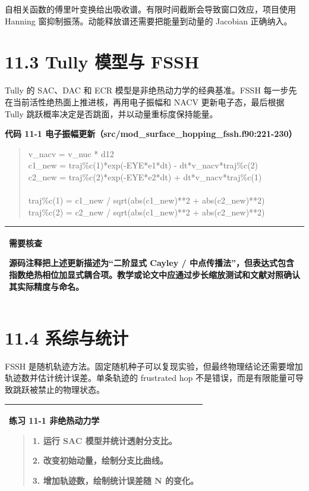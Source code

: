 \documentclass[UTF8,openany,11pt,fontset=fandol]{ctexbook}
\begin{document}
自相关函数的傅里叶变换给出吸收谱。有限时间截断会导致窗口效应，项目使用
Hanning 窗抑制振荡。动能释放谱还需要把能量到动量的 Jacobian 正确纳入。

\section{\texorpdfstring{\textbf{11.3 Tully 模型与
FSSH}}{11.3 Tully 模型与 FSSH}}\label{tully-ux6a21ux578bux4e0e-fssh}

Tully 的 SAC、DAC 和 ECR 模型是非绝热动力学的经典基准。FSSH
每一步先在当前活性绝热面上推进核，再用电子振幅和 NACV
更新电子态，最后根据 Tully
跳跃概率决定是否跳面，并以动量重标度保持能量。

\textbf{代码 11-1
电子振幅更新（src/mod\_surface\_hopping\_fssh.f90:221-230）}

\begin{quote}
v\_nacv = v\_nuc * d12\\
c1\_new = traj\%c(1)*exp(-EYE*e1*dt) - dt*v\_nacv*traj\%c(2)\\
c2\_new = traj\%c(2)*exp(-EYE*e2*dt) + dt*v\_nacv*traj\%c(1)\\
~\\
traj\%c(1) = c1\_new / sqrt(abs(c1\_new)**2 + abs(c2\_new)**2)\\
traj\%c(2) = c2\_new / sqrt(abs(c1\_new)**2 + abs(c2\_new)**2)
\end{quote}

\begin{longtable}[]{@{}l@{}}
\toprule
\endhead
\begin{minipage}[t]{0.97\columnwidth}\raggedright
\textbf{需要核查}

源码注释把上述更新描述为``二阶显式 Cayley /
中点传播法''，但表达式包含指数绝热相位加显式耦合项。教学或论文中应通过步长缩放测试和文献对照确认其实际精度与命名。\strut
\end{minipage}\tabularnewline
\bottomrule
\end{longtable}

\section{\texorpdfstring{\textbf{11.4
系综与统计}}{11.4 系综与统计}}\label{ux7cfbux7efcux4e0eux7edfux8ba1}

FSSH
是随机轨迹方法。固定随机种子可以复现实验，但最终物理结论还需要增加轨迹数并估计统计误差。单条轨迹的
frustrated hop 不是错误，而是有限能量可导致跳跃被禁止的物理状态。

\begin{longtable}[]{@{}l@{}}
\toprule
\endhead
\begin{minipage}[t]{0.97\columnwidth}\raggedright
\textbf{练习 11-1 非绝热动力学}

\begin{quote}
1. 运行 SAC 模型并统计透射分支比。

2. 改变初始动量，绘制分支比曲线。

3. 增加轨迹数，绘制统计误差随 N 的变化。
\end{quote}\strut
\end{minipage}\tabularnewline
\bottomrule
\end{longtable}
\end{document}
